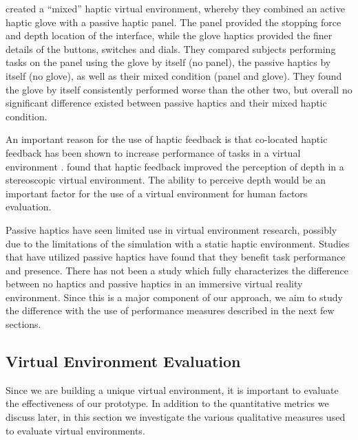 \citet{borst_evaluation_2005} created a ``mixed'' haptic virtual environment, whereby they combined an active haptic glove with a passive haptic panel.
The panel provided the stopping force and depth location of the interface, while the glove haptics provided the finer details of the buttons, switches and dials.
They compared subjects performing tasks on the panel using the glove by itself (no panel), the passive haptics by itself (no glove), as well as their mixed condition (panel and glove).
They found the glove by itself consistently performed worse than the other two, but overall no significant difference existed between passive haptics and their mixed haptic condition.

An important reason for the use of haptic feedback is that co-located haptic feedback has been shown to increase performance of tasks in a virtual environment \citep{swapp_interaction_2006}.
\citet{bouguila_effect_2000} found that haptic feedback improved the perception of depth in a stereoscopic virtual environment.
The ability to perceive depth would be an important factor for the use of a virtual environment for human factors evaluation.

Passive haptics have seen limited use in virtual environment research, possibly due to the limitations of the simulation with a static haptic environment.
Studies that have utilized passive haptics have found that they benefit task performance and presence.
There has not been a study which fully characterizes the difference between no haptics and passive haptics in an immersive virtual reality environment.
Since this is a major component of our approach, we aim to study the difference with the use of performance measures described in the next few sections.

\subsection{Virtual Environment Evaluation}
\label{virtual-environment-evaluation}

Since we are building a unique virtual environment, it is important to evaluate the effectiveness of our prototype.
In addition to the quantitative metrics we discuss later, in this section we investigate the various qualitative measures used to evaluate virtual environments.

